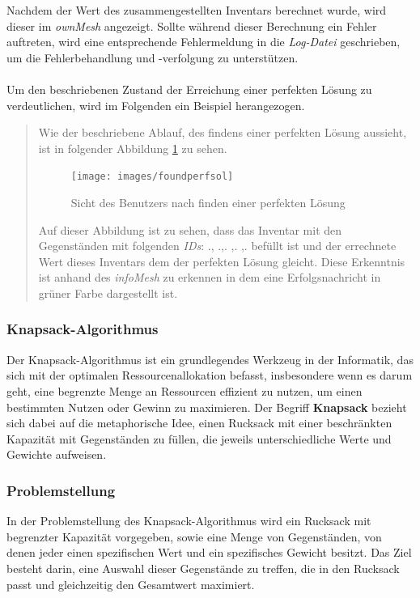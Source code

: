 Nachdem der Wert des zusammengestellten Inventars berechnet wurde, wird dieser im \textit{ownMesh} angezeigt. Sollte während
dieser Berechnung ein Fehler auftreten, wird eine entsprechende Fehlermeldung in die \textit{Log-Datei} geschrieben, um
die Fehlerbehandlung und -verfolgung zu unterstützen.\\
\\
Um den beschriebenen Zustand der Erreichung einer perfekten Lösung zu verdeutlichen, wird im Folgenden ein Beispiel herangezogen.

\begin{quote}
Wie der beschriebene Ablauf, des findens einer perfekten Lösung aussieht, ist in folgender Abbildung \ref{fig:foundperfsol}
zu sehen.
\begin{figure}[H]
\centering
\texttt{[image: images/foundperfsol]}
\caption{Sicht des Benutzers nach finden einer perfekten Lösung}
\label{fig:foundperfsol}
\end{figure}

Auf dieser Abbildung ist zu sehen, dass das Inventar mit den Gegenständen mit folgenden \textit{IDs}: ., .,. ,. ,. befüllt
ist und der errechnete Wert dieses Inventars dem der perfekten Lösung gleicht. Diese Erkenntnis ist anhand des \textit{infoMesh}
zu erkennen in dem eine Erfolgsnachricht in grüner Farbe dargestellt ist.
\end{quote}

\subsubsection{Knapsack-Algorithmus}
Der Knapsack-Algorithmus ist ein grundlegendes Werkzeug in der Informatik, das sich mit der optimalen Ressourcenallokation
befasst, insbesondere wenn es darum geht, eine begrenzte Menge an Ressourcen effizient zu nutzen, um einen bestimmten
Nutzen oder Gewinn zu maximieren. Der Begriff \textbf{Knapsack} bezieht sich dabei auf die metaphorische Idee, einen
Rucksack mit einer beschränkten Kapazität mit Gegenständen zu füllen, die jeweils unterschiedliche Werte und Gewichte
aufweisen.

\subsubsection*{Problemstellung}
In der Problemstellung des Knapsack-Algorithmus wird ein Rucksack mit begrenzter Kapazität vorgegeben, sowie eine Menge
von Gegenständen, von denen jeder einen spezifischen Wert und ein spezifisches Gewicht besitzt. Das Ziel besteht darin,
eine Auswahl dieser Gegenstände zu treffen, die in den Rucksack passt und gleichzeitig den Gesamtwert maximiert.

